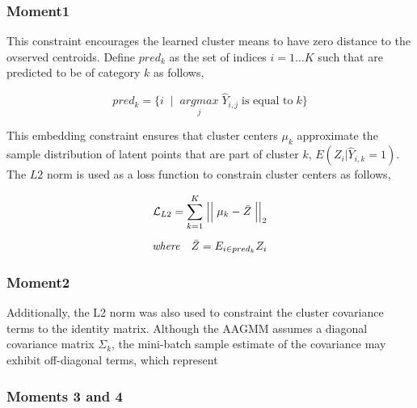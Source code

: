 \documentclass[10pt,twocolumn,letterpaper]{article}
\begin{document}
%

\subsubsection{Moment1}

This constraint encourages the learned cluster means to have zero distance to the ovserved centroids. 
Define $pred_k$ as the set of indices $i=1 \dots K$ such that are predicted to be of category $k$ as follows,

\begin{equation}
	pred_k = \{i \;\; | \;\; \underset{j}{argmax} \; \hat{Y}_{i,j} \; \text{is equal to} \; k\}
\end{equation}

This embedding constraint ensures that cluster centers $\mu_k$ approximate the sample distribution of latent points that are part of cluster $k$, $E(Z_i|\hat{Y}_{i,k}=1)$. 
The $L2$ norm is used as a loss function to constrain cluster centers as follows,

\begin{equation}
	\begin{aligned}
		\mathcal{L}_{L2} = \sum_{k=1}^K \Bigm\lvert\Bigm\lvert \mu_k - \bar{Z} \Bigm\lvert\Bigm\lvert_2 \\[5pt]
		\textit{where} \quad \bar{Z} = E_{i \in pred_k}Z_i
	\end{aligned}
\end{equation}

\subsubsection{Moment2}

Additionally, the L2 norm was also used to constraint the cluster covariance terms to the identity matrix.
Although the AAGMM assumes a diagonal covariance matrix $\Sigma_k$, the mini-batch sample estimate of the covariance may exhibit off-diagonal terms, which represent

\subsubsection{Moments 3 and 4}
\end{document}
